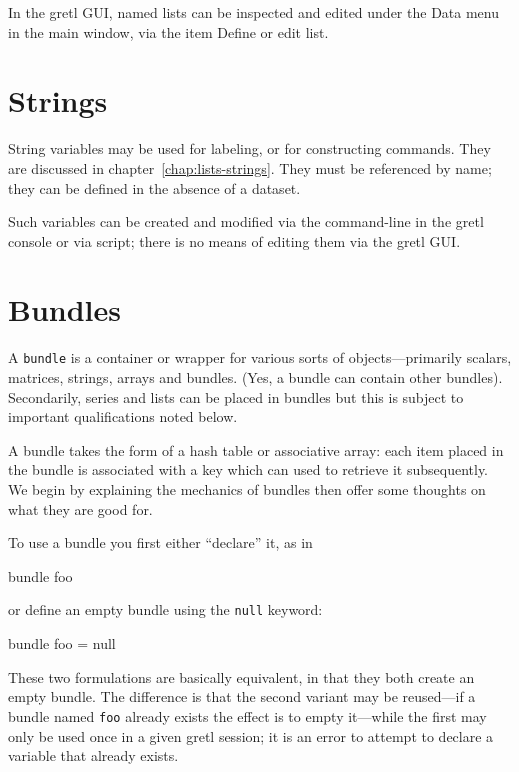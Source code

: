 In the gretl GUI, named lists can be inspected and edited under the
\textsf{Data} menu in the main window, via the item \textsf{Define or
  edit list}.

\section{Strings}
\label{sec:Strings}

String variables may be used for labeling, or for constructing
commands. They are discussed in chapter~\ref{chap:lists-strings}. They
must be referenced by name; they can be defined in the absence of a
dataset.

Such variables can be created and modified via the command-line in
the gretl console or via script; there is no means of editing them
via the gretl GUI.


\section{Bundles}
\label{sec:Bundles}

A \texttt{bundle} is a container or wrapper for various sorts of
objects---primarily scalars, matrices, strings, arrays and
bundles. (Yes, a bundle can contain other bundles). Secondarily,
series and lists can be placed in bundles but this is subject to
important qualifications noted below.

A bundle takes the form of a hash table or associative array: each
item placed in the bundle is associated with a key which can used to
retrieve it subsequently. We begin by explaining the mechanics of
bundles then offer some thoughts on what they are good for.

To use a bundle you first either ``declare'' it, as in
%
\begin{code}
bundle foo
\end{code}
%
or define an empty bundle using the \texttt{null} keyword:
%
\begin{code}
bundle foo = null
\end{code}
%
These two formulations are basically equivalent, in that they both
create an empty bundle. The difference is that the second variant may
be reused---if a bundle named \texttt{foo} already exists the effect
is to empty it---while the first may only be used once in a given
gretl session; it is an error to attempt to declare a variable that
already exists.

